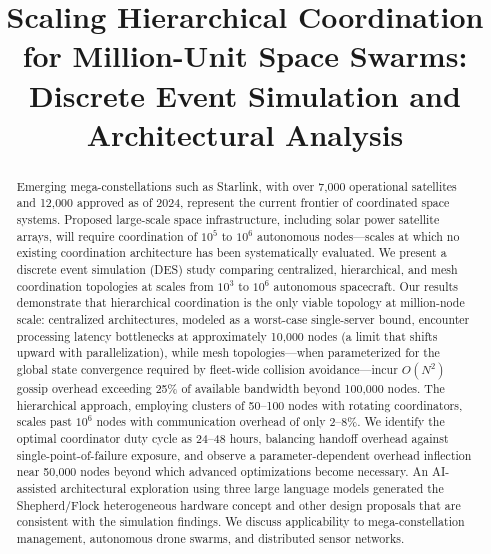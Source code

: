 \documentclass[journal]{IEEEtran}
\begin{document}
\title{Scaling Hierarchical Coordination for Million-Unit Space Swarms: Discrete Event Simulation and Architectural Analysis}

\author{
}


\maketitle

\begin{abstract}
Emerging mega-constellations such as Starlink, with over 7{,}000 operational satellites and 12{,}000 approved as of 2024, represent the current frontier of coordinated space systems. Proposed large-scale space infrastructure, including solar power satellite arrays, will require coordination of $10^5$ to $10^6$ autonomous nodes---scales at which no existing coordination architecture has been systematically evaluated. We present a discrete event simulation (DES) study comparing centralized, hierarchical, and mesh coordination topologies at scales from $10^3$ to $10^6$ autonomous spacecraft. Our results demonstrate that hierarchical coordination is the only viable topology at million-node scale: centralized architectures, modeled as a worst-case single-server bound, encounter processing latency bottlenecks at approximately 10{,}000 nodes (a limit that shifts upward with parallelization), while mesh topologies---when parameterized for the global state convergence required by fleet-wide collision avoidance---incur $O(N^2)$ gossip overhead exceeding 25\% of available bandwidth beyond 100{,}000 nodes. The hierarchical approach, employing clusters of 50--100 nodes with rotating coordinators, scales past $10^6$ nodes with communication overhead of only 2--8\%. We identify the optimal coordinator duty cycle as 24--48 hours, balancing handoff overhead against single-point-of-failure exposure, and observe a parameter-dependent overhead inflection near 50{,}000 nodes beyond which advanced optimizations become necessary. An AI-assisted architectural exploration using three large language models generated the Shepherd/Flock heterogeneous hardware concept and other design proposals that are consistent with the simulation findings. We discuss applicability to mega-constellation management, autonomous drone swarms, and distributed sensor networks.
\end{abstract}
\end{document}
